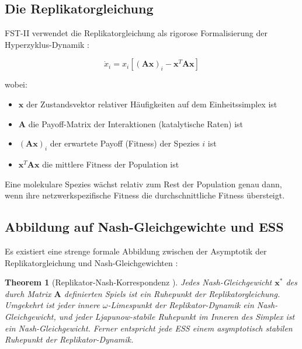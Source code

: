 \documentclass[12pt,a4paper]{article}
\newtheorem{theorem}{Theorem}
\theoremstyle{remark}
\begin{document}
\subsection{Die Replikatorgleichung}

FST-II verwendet die Replikatorgleichung als rigorose Formalisierung der Hyperzyklus-Dynamik \citep{ReplicatorEntropy,ReplicatorDiffusion}:

\begin{equation}
\dot{x}_i = x_i \left[ (\mathbf{A}\mathbf{x})_i - \mathbf{x}^T \mathbf{A} \mathbf{x} \right]
\end{equation}

wobei:
\begin{itemize}
    \item $\mathbf{x}$ der Zustandsvektor relativer H\"aufigkeiten auf dem Einheitssimplex ist
    \item $\mathbf{A}$ die Payoff-Matrix der Interaktionen (katalytische Raten) ist
    \item $(\mathbf{A}\mathbf{x})_i$ der erwartete Payoff (Fitness) der Spezies $i$ ist
    \item $\mathbf{x}^T \mathbf{A} \mathbf{x}$ die mittlere Fitness der Population ist
\end{itemize}

Eine molekulare Spezies w\"achst relativ zum Rest der Population genau dann, wenn ihre netzwerkspezifische Fitness die durchschnittliche Fitness \"ubersteigt.

\subsection{Abbildung auf Nash-Gleichgewichte und ESS}

Es existiert eine strenge formale Abbildung zwischen der Asymptotik der Replikatorgleichung und Nash-Gleichgewichten \citep{HofbauerSigmund1998,HofbauerSigmund2003}:

\begin{theorem}[Replikator-Nash-Korrespondenz {\citep{HofbauerSigmund2003,HofbauerSigmund1998}}]
\label{thm:replicator-nash}
Jedes Nash-Gleichgewicht $\mathbf{x}^*$ des durch Matrix $\mathbf{A}$ definierten Spiels ist ein Ruhepunkt der Replikatorgleichung. Umgekehrt ist jeder innere $\omega$-Limespunkt der Replikator-Dynamik ein Nash-Gleichgewicht, und jeder Ljapunow-stabile Ruhepunkt im Inneren des Simplex ist ein Nash-Gleichgewicht. Ferner entspricht jede ESS einem asymptotisch stabilen Ruhepunkt der Replikator-Dynamik.
\end{theorem}
\end{document}
